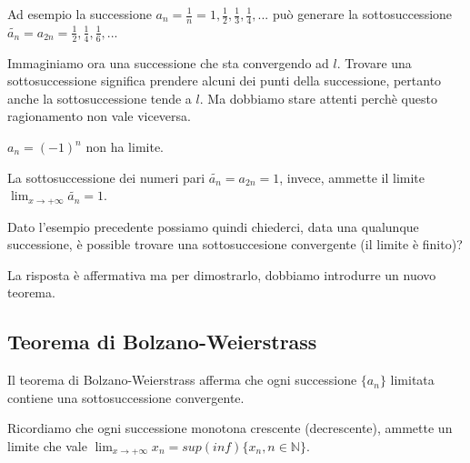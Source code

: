 Ad esempio la successione $a_n=\frac{1}{n}=1,\frac{1}{2},\frac{1}{3},\frac{1}{4},...$ può generare la sottosuccessione $\widetilde{a_n}=a_{2n}=\frac{1}{2},\frac{1}{4},\frac{1}{6},...$

Immaginiamo ora una successione che sta convergendo ad $l$. Trovare una sottosuccessione significa prendere alcuni dei punti della successione, pertanto anche la sottosuccessione tende a $l$. Ma dobbiamo stare attenti perchè questo ragionamento non vale viceversa.

\begin{example}
    $a_n=(-1)^n$ non ha limite.
    
    La sottosuccessione dei numeri pari $\widetilde{a_n}=a_{2n}=1$, invece, ammette il limite $\lim_{x\to+\infty}\widetilde{a_n}=1$.
\end{example}

Dato l'esempio precedente possiamo quindi chiederci, data una qualunque successione, è possible trovare una sottosuccesione convergente (il limite è finito)?

La risposta è affermativa ma per dimostrarlo, dobbiamo introdurre un nuovo teorema.

\subsection{Teorema di Bolzano-Weierstrass}
Il teorema di Bolzano-Weierstrass afferma che ogni successione $\{a_n\}$ limitata contiene una sottosuccessione convergente.

Ricordiamo che ogni successione monotona crescente (decrescente), ammette un limite che vale $\lim_{x\to+\infty}x_n=sup(inf)\{x_n, n\in\mathbb{N}\}$.

